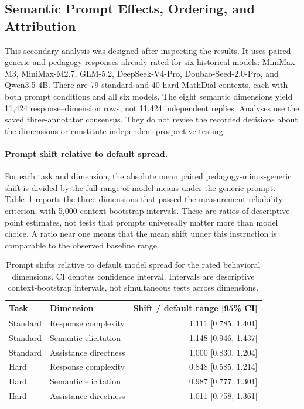 \subsection{Semantic Prompt Effects, Ordering, and Attribution}
\label{app:prompt-response}

This secondary analysis was designed after inspecting the results. It uses paired generic and
pedagogy responses already rated for six historical models: MiniMax-M3,
MiniMax-M2.7, GLM-5.2, DeepSeek-V4-Pro, Doubao-Seed-2.0-Pro, and Qwen3.5-4B.
There are 79 standard and 40 hard MathDial contexts, each with both prompt
conditions and all six models. The eight semantic dimensions yield 11,424
response--dimension rows, not 11,424 independent replies. Analyses use the
saved three-annotator consensus. They do not revise the recorded decisions about the dimensions
or constitute independent prospective testing.

\paragraph{Prompt shift relative to default spread.}
For each task and dimension, the absolute mean paired pedagogy-minus-generic
shift is divided by the full range of model means under the generic prompt.
Table~\ref{tab:prompt-scale} reports the three dimensions that passed the
measurement reliability criterion, with 5,000 context-bootstrap intervals. These are
ratios of descriptive point estimates, not tests that prompts universally
matter more than model choice. A ratio near one means that the mean shift
under this instruction is comparable to the observed baseline range.

\begin{table}[t]
\centering\small
\begin{tabular}{llr}
\toprule
Task & Dimension & Shift / default range [95\% CI]\\
\midrule
Standard & Response complexity & 1.111 [0.785, 1.401]\\
Standard & Semantic elicitation & 1.148 [0.946, 1.437]\\
Standard & Assistance directness & 1.000 [0.830, 1.204]\\
Hard & Response complexity & 0.848 [0.585, 1.214]\\
Hard & Semantic elicitation & 0.987 [0.777, 1.301]\\
Hard & Assistance directness & 1.011 [0.758, 1.361]\\
\bottomrule
\end{tabular}
\caption{Prompt shifts relative to default model spread for the rated behavioral dimensions. CI denotes confidence interval. Intervals are descriptive context-bootstrap intervals, not simultaneous tests across dimensions.}
\label{tab:prompt-scale}
\end{table}


